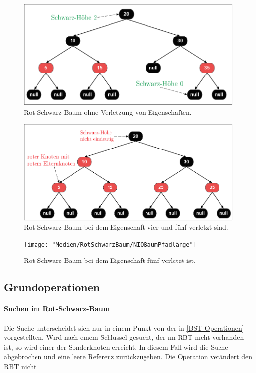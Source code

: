 \documentclass[a4paper,12pt]{article}
\begin{document}
\begin{figure}[H]
	\centering
	\includegraphics[width= 1\textwidth]{"Medien/RotSchwarzBaum/IOBaum"}
	\caption{Rot-Schwarz-Baum ohne Verletzung von Eigenschaften. }
	\label{fig:IOBaum}
\end{figure}
\begin{figure}[H]
	\centering
	\includegraphics[width= 1\textwidth]{"Medien/RotSchwarzBaum/NIOBaumZweiRote"}
	\caption{Rot-Schwarz-Baum bei dem Eigenschaft vier und fünf verletzt sind. }
	\label{fig:NIOBaumZweiRote}
\end{figure}
\begin{figure}[H]
	\centering
	\texttt{[image: "Medien/RotSchwarzBaum/NIOBaumPfadlänge"]}
	\caption{Rot-Schwarz-Baum bei dem Eigenschaft fünf verletzt ist.  }
	\label{fig:NIOBaumPfadlänge}
\end{figure}
\subsection{Grundoperationen}
\paragraph{Suchen im Rot-Schwarz-Baum}
Die Suche unterscheidet sich nur in einem Punkt von der in \ref{BST Operationen} vorgestellten. Wird nach einem Schlüssel gesucht, der im RBT nicht vorhanden ist, so wird einer der Sonderknoten erreicht. In diesem Fall wird die Suche abgebrochen und eine leere Referenz zurückzugeben. Die Operation verändert den RBT nicht. 
\end{document}
